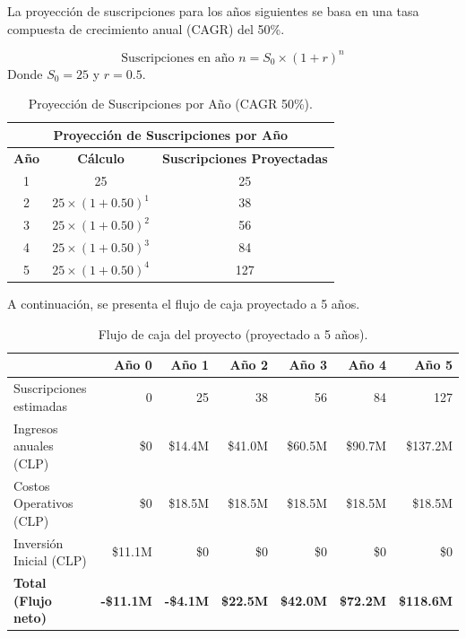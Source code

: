 La proyección de suscripciones para los años siguientes se basa en una tasa compuesta de crecimiento anual (CAGR) del 50\%.

$$
\text{Suscripciones en año } n = S_0 \times (1 + r)^n
$$
Donde $S_0 = 25$ y $r = 0.5$.

\begin{table}[H]
    \centering
    \caption{Proyección de Suscripciones por Año (CAGR 50\%).}
    \label{tab:proyeccion_suscripciones}
    \begin{tabular}{|c|c|c|}
    \hline
    \multicolumn{3}{|c|}{\textbf{Proyección de Suscripciones por Año}}\\
    \hline
    \textbf{Año} & \textbf{Cálculo} & \textbf{Suscripciones Proyectadas}\\
    \hline
    1 & 25 & 25\\
    \hline
    2 & $25 \times (1 + 0.50)^1$ & 38\\
    \hline
    3 & $25 \times (1 + 0.50)^2$ & 56\\
    \hline
    4 & $25 \times (1 + 0.50)^3$ & 84\\
    \hline
    5 & $25 \times (1 + 0.50)^4$ & 127\\
    \hline
    \end{tabular}
\end{table}

A continuación, se presenta el flujo de caja proyectado a 5 años.

\begin{table}[H]
    \centering
    \caption{Flujo de caja del proyecto (proyectado a 5 años).}
    \label{tab:flujo_de_caja}
    \footnotesize
    \setlength{\tabcolsep}{3pt} %
    \begin{tabularx}{\textwidth}{|X|r|r|r|r|r|r|}
    \hline
     & \textbf{Año 0} & \textbf{Año 1} & \textbf{Año 2} & \textbf{Año 3} & \textbf{Año 4} & \textbf{Año 5} \\
    \hline
    Suscripciones estimadas & 0 & 25 & 38 & 56 & 84 & 127 \\
    \hline
    Ingresos anuales (CLP) & \$0 & \$14.4M & \$41.0M & \$60.5M & \$90.7M & \$137.2M \\
    \hline
    Costos Operativos (CLP) & \$0 & \$18.5M & \$18.5M & \$18.5M & \$18.5M & \$18.5M \\
    \hline
    Inversión Inicial (CLP) & \$11.1M & \$0 & \$0 & \$0 & \$0 & \$0 \\
    \hline
    \textbf{Total (Flujo neto)} & \textbf{-\$11.1M} & \textbf{-\$4.1M} & \textbf{\$22.5M} & \textbf{\$42.0M} & \textbf{\$72.2M} & \textbf{\$118.6M} \\
    \hline
    \end{tabularx}
\end{table}


